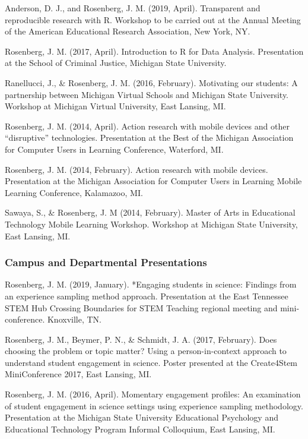 \documentclass[]{article}
\begin{document}
Anderson, D. J., and Rosenberg, J. M. (2019, April). Transparent and
reproducible research with R. Workshop to be carried out at the Annual
Meeting of the American Educational Research Association, New York, NY.

Rosenberg, J. M. (2017, April). Introduction to R for Data Analysis.
Presentation at the School of Criminal Justice, Michigan State
University.

Ranellucci, J., \& Rosenberg, J. M. (2016, February). Motivating our
students: A partnership between Michigan Virtual Schools and Michigan
State University. Workshop at Michigan Virtual University, East Lansing,
MI.

Rosenberg, J. M. (2014, April). Action research with mobile devices and
other ``disruptive'' technologies. Presentation at the Best of the
Michigan Association for Computer Users in Learning Conference,
Waterford, MI.

Rosenberg, J. M. (2014, February). Action research with mobile devices.
Presentation at the Michigan Association for Computer Users in Learning
Mobile Learning Conference, Kalamazoo, MI.

Sawaya, S., \& Rosenberg, J. M (2014, February). Master of Arts in
Educational Technology Mobile Learning Workshop. Workshop at Michigan
State University, East Lansing, MI.

\subsubsection{Campus and Departmental
Presentations}\label{campus-and-departmental-presentations}

Rosenberg, J. M. (2019, January). *Engaging students in science:
Findings from an experience sampling method approach. Presentation at
the East Tennessee STEM Hub Crossing Boundaries for STEM Teaching
regional meeting and mini-conference. Knoxville, TN.

Rosenberg, J. M., Beymer, P. N., \& Schmidt, J. A. (2017, February).
Does choosing the problem or topic matter? Using a person-in-context
approach to understand student engagement in science. Poster presented
at the Create4Stem MiniConference 2017, East Lansing, MI.

Rosenberg, J. M. (2016, April). Momentary engagement profiles: An
examination of student engagement in science settings using experience
sampling methodology. Presentation at the Michigan State University
Educational Psychology and Educational Technology Program Informal
Colloquium, East Lansing, MI.
\end{document}
